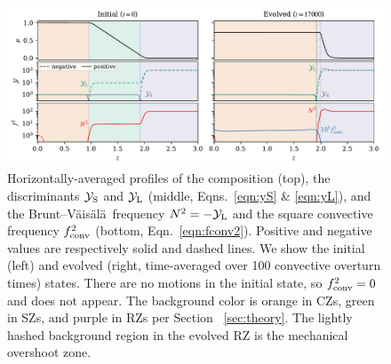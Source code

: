 \documentclass[twocolumn, linenumbers, twocolappendix]{aastex631}
\newcommand{\yL}{\ensuremath{\mathcal{Y}_{\rm{L}}}}
\newcommand{\yS}{\ensuremath{\mathcal{Y}_{\rm{S}}}}
\newcommand{\brunt}{{Brunt--V\"{a}is\"{a}l\"{a}}}
\begin{document}


\begin{figure}[t]
\centering
\includegraphics[width=\textwidth]{fig2_profiles.pdf}
\caption{
    Horizontally-averaged profiles of the composition (top), the discriminants $\yS$ and $\yL$ (middle, Eqns.~\ref{eqn:yS} \& \ref{eqn:yL}), and the \brunt$\,$ frequency $N^2 = -\yL$ and the square convective frequency $f_{\rm{conv}}^2$ (bottom, Eqn.~\ref{eqn:fconv2}).
    Positive and negative values are respectively solid and dashed lines.
    We show the initial (left) and evolved (right, time-averaged over 100 convective overturn times) states.
    There are no motions in the initial state, so $f_{\rm{conv}}^2 = 0$ and does not appear.
    The background color is orange in CZs, green in SZs, and purple in RZs per Section ~\ref{sec:theory}.
    The lightly hashed background region in the evolved RZ is the mechanical overshoot zone.
\label{fig:profiles}
}
\end{figure}




\end{document}
